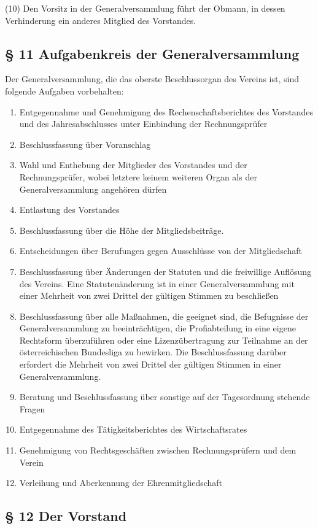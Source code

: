 \documentclass[10pt,a4paper]{article}
\begin{document}
(10)
Den Vorsitz in der Generalversammlung führt der Obmann, in dessen Verhinderung ein anderes Mitglied des Vorstandes.

\subsection{§ 11
Aufgabenkreis der Generalversammlung}

Der Generalversammlung, die das oberste Beschlussorgan des Vereins ist, sind folgende Aufgaben vorbehalten:
\begin{enumerate}
\item
Entgegennahme und Genehmigung des Rechenschaftsberichtes des Vorstandes und des Jahresabschlusses unter Einbindung der Rechnungsprüfer
\item
Beschlussfassung über Voranschlag
\item
Wahl und Enthebung der Mitglieder des Vorstandes und der Rechnungsprüfer, wobei letztere keinem weiteren Organ als der Generalversammlung angehören dürfen
\item
Entlastung des Vorstandes
\item
Beschlussfassung über die Höhe der Mitgliedsbeiträge.
\item
Entscheidungen über Berufungen gegen Ausschlüsse von der Mitgliedschaft
\item
Beschlussfassung über Änderungen der Statuten und die freiwillige Auflösung des Vereins.
Eine Statutenänderung ist in einer Generalversammlung mit einer Mehrheit von zwei Drittel der gültigen Stimmen zu beschließen
\item
Beschlussfassung über alle Maßnahmen, die geeignet sind, die Befugnisse der Generalversammlung zu beeinträchtigen, die Profiabteilung in eine eigene Rechtsform überzuführen oder eine Lizenzübertragung zur Teilnahme an der österreichischen Bundesliga zu bewirken.
Die Beschlussfassung darüber erfordert die Mehrheit von zwei Drittel der gültigen Stimmen in einer Generalversammlung.
\item
Beratung und Beschlussfassung über sonstige auf der Tagesordnung stehende Fragen
\item
Entgegennahme des Tätigkeitsberichtes des Wirtschaftsrates
\item
Genehmigung von Rechtsgeschäften zwischen Rechnungsprüfern und dem Verein
\item
Verleihung und Aberkennung der Ehrenmitgliedschaft
\end{enumerate}

\subsection{§ 12
Der Vorstand}
\end{document}
